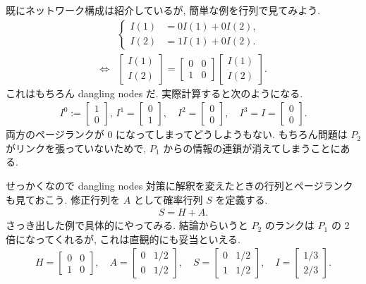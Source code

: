 \documentclass[openany, a4paper, oneside]{jsbook}
\begin{document}
既にネットワーク構成は紹介しているが, 簡単な例を行列で見てみよう.
\begin{align}
 &\begin{cases}
  I(1)
  &=
  0 I(1) + 0 I(2),\\
  I(2)
  &=
  1 I(1) + 0 I(2).
 \end{cases}\\
 \Leftrightarrow
 &\begin{bmatrix}
  I(1)\\
  I(2)
 \end{bmatrix}
 =
 \begin{bmatrix}
  0 & 0 \\
  1 & 0
 \end{bmatrix}
 \begin{bmatrix}
  I(1)\\
  I(2)
 \end{bmatrix}
 .
\end{align}
これはもちろん dangling nodes だ.
実際計算すると次のようになる.
\begin{align}
 I^0
 :=
 \begin{bmatrix}
  1 \\
  0
 \end{bmatrix}
 , \,
 I^1
 =
 \begin{bmatrix}
  0 \\
  1
 \end{bmatrix}
 , \quad
 I^2
 =
 \begin{bmatrix}
  0 \\
  0
 \end{bmatrix}
 , \quad
 I^3
 =
 I
 =
 \begin{bmatrix}
  0 \\
  0
 \end{bmatrix}
 .
\end{align}
両方のページランクが 0 になってしまってどうしようもない.
もちろん問題は $P_2$ がリンクを張っていないためで,
$P_1$ からの情報の連鎖が消えてしまうことにある.

せっかくなので dangling nodes 対策に解釈を変えたときの行列とページランクも見ておこう.
修正行列を $A$ として確率行列 $S$ を定義する.
\begin{align}
 S
 =
 H + A.
\end{align}
さっき出した例で具体的にやってみる.
結論からいうと $P_2$ のランクは $P_1$ の 2 倍になってくれるが, これは直観的にも妥当といえる.
\begin{gather}
 H
 =
 \begin{bmatrix}
  0 & 0\\
  1 & 0
 \end{bmatrix}
 , \quad
 A
 =
 \begin{bmatrix}
  0 & 1/2 \\
  0 & 1/2
 \end{bmatrix}
 , \quad
 S
 =
 \begin{bmatrix}
  0 & 1/2\\
  1 & 1/2
 \end{bmatrix}
 , \quad
 I
 =
 \begin{bmatrix}
  1/3 \\
  2/3
 \end{bmatrix}
 .
\end{gather}
\end{document}
